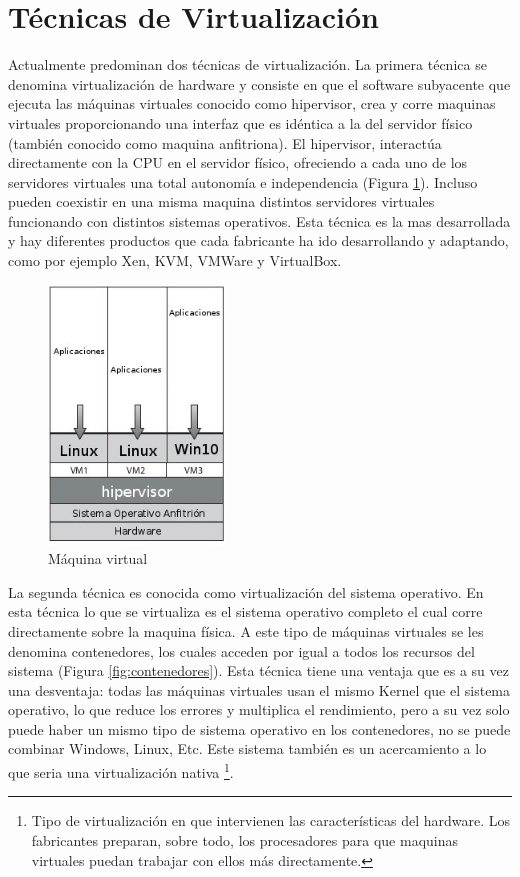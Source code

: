 \section{Técnicas de Virtualización}
Actualmente predominan dos técnicas de virtualización. La primera técnica se denomina virtualización de hardware y consiste en que el software subyacente que ejecuta las máquinas virtuales conocido como hipervisor, crea y corre maquinas virtuales proporcionando una interfaz que es idéntica a la del servidor físico (también conocido como maquina anfitriona). El hipervisor, interactúa directamente con la CPU en el servidor físico, ofreciendo a cada uno de los servidores virtuales una total autonomía e independencia (Figura \ref{fig:hipervisor}). Incluso pueden coexistir en una misma maquina distintos servidores virtuales funcionando con distintos sistemas operativos. Esta técnica es la mas desarrollada y hay diferentes productos que cada fabricante ha ido desarrollando y adaptando, como por ejemplo Xen, KVM, VMWare y VirtualBox.\\

\begin{figure}[h]
    \centering
	\caption{Máquina virtual}
	\label{fig:hipervisor}
	\includegraphics[width = 0.42\textwidth]{../architecture/v1/diagrams/virtualmachine}
\end{figure}

\newpage
La segunda técnica es conocida como virtualización del sistema operativo. En esta técnica lo que se virtualiza es el sistema operativo completo el cual corre directamente sobre la maquina física. A este tipo de máquinas virtuales se les denomina contenedores, los cuales acceden por igual a todos los recursos del sistema (Figura \ref{fig:contenedores}). Esta técnica tiene una ventaja que es a su vez una desventaja: todas las máquinas virtuales usan el mismo Kernel que el sistema operativo, lo que reduce los errores y multiplica el rendimiento, pero a su vez solo puede haber un mismo tipo de sistema operativo en los contenedores, no se puede combinar Windows, Linux, Etc. Este sistema también es un acercamiento a lo que seria una virtualización nativa \footnote{Tipo de virtualización en que intervienen las características del hardware. Los fabricantes preparan, sobre todo, los procesadores para que maquinas virtuales puedan trabajar con ellos más directamente.}.\\

